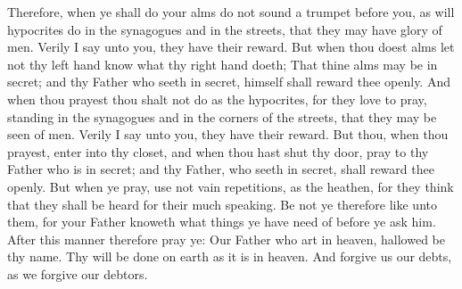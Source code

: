 Therefore, when ye shall do your alms do not sound a trumpet before you, as will hypocrites do in the synagogues and in the streets, that they may have glory of men. Verily I say unto you, they have their reward.
\bverse \iffalse But when thou doest alms let not thy left hand know what thy right hand doeth; \fi
But when thou doest alms let not thy left hand know what thy right hand doeth;
\bverse \iffalse That thine alms may be in secret; and thy Father who seeth in secret, himself shall reward thee openly. \fi
That thine alms may be in secret; and thy Father who seeth in secret, himself shall reward thee openly.
\bverse \iffalse And when thou prayest thou shalt not do as the hypocrites, for they love to pray, standing in the synagogues and in the corners of the streets, that they may be seen of men. Verily I say unto you, they have their reward. \fi
And when thou prayest thou shalt not do as the hypocrites, for they love to pray, standing in the synagogues and in the corners of the streets, that they may be seen of men. Verily I say unto you, they have their reward.
\bverse \iffalse But thou, when thou prayest, enter into thy closet, and when thou hast shut thy door, pray to thy Father who is in secret; and thy Father, who seeth in secret, shall reward thee openly. \fi
But thou, when thou prayest, enter into thy closet, and when thou hast shut thy door, pray to thy Father who is in secret; and thy Father, who seeth in secret, shall reward thee openly.
\bverse \iffalse But when ye pray, use not vain repetitions, as the heathen, for they think that they shall be heard for their much speaking. \fi
But when ye pray, use not vain repetitions, as the heathen, for they think that they shall be heard for their much speaking.
\bverse \iffalse Be not ye therefore like unto them, for your Father knoweth what things ye have need of before ye ask him. \fi
Be not ye therefore like unto them, for your Father knoweth what things ye have need of before ye ask him.
\bverse \iffalse After this manner therefore pray ye: Our Father who art in heaven, hallowed be thy name. \fi
After this manner therefore pray ye: Our Father who art in heaven, hallowed be thy name.
\bverse \iffalse Thy will be done on earth as it is in heaven. \fi
Thy will be done on earth as it is in heaven.
\bverse \iffalse And forgive us our debts, as we forgive our debtors. \fi
And forgive us our debts, as we forgive our debtors.
\bverse \iffalse And lead us not into temptation, but deliver us from evil. \fi
